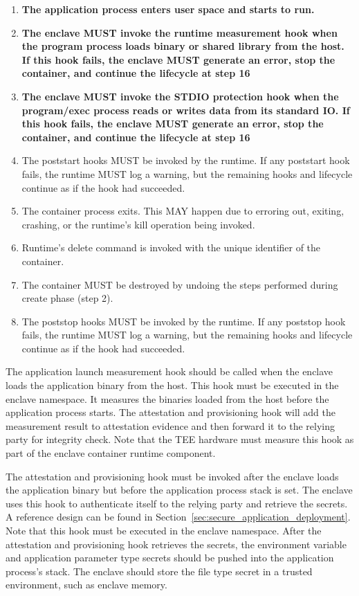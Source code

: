 \begin{enumerate}
    \item \textbf{The application process enters user space and starts to run.}
    \item \textbf{The enclave MUST invoke the runtime measurement hook when the program process loads binary or shared library from the host. If this hook fails, the enclave MUST generate an error, stop the container, and continue the lifecycle at step 16}
    \item \textbf{The enclave MUST invoke the STDIO protection hook when the program/exec process reads or writes data from its standard IO. If this hook fails, the enclave MUST generate an error, stop the container, and continue the lifecycle at step 16}
    \item The poststart hooks MUST be invoked by the runtime. If any poststart hook fails, the runtime MUST log a warning, but the remaining hooks and lifecycle continue as if the hook had succeeded.
    \item The container process exits. This MAY happen due to erroring out, exiting, crashing, or the runtime's kill operation being invoked.
    \item Runtime's delete command is invoked with the unique identifier of the container.
    \item The container MUST be destroyed by undoing the steps performed during create phase (step 2).
    \item The poststop hooks MUST be invoked by the runtime. If any poststop hook fails, the runtime MUST log a warning, but the remaining hooks and lifecycle continue as if the hook had succeeded.    
  \end{enumerate}

  

  The application launch measurement hook should be called when the enclave loads the application binary from the host. This hook must be executed in the enclave namespace. It measures the binaries loaded from the host before the application process starts. The attestation and provisioning hook will add the measurement result to attestation evidence and then 
  forward it to the relying party for integrity check. Note that the TEE hardware must measure this hook as part of the enclave container runtime component.
 
  The attestation and provisioning hook must be invoked after the enclave loads the application binary but before the application process stack is set. The enclave uses this hook to authenticate itself to the relying party and retrieve the secrets. A reference design can be found in Section~\ref{sec:secure_application_deployment}. Note that this hook must be 
  executed in the enclave namespace. After the attestation and provisioning hook retrieves the secrets, the environment variable and application parameter type secrets should be pushed into the application process's stack. The enclave should store the file type secret in a trusted environment, such as enclave memory. 
   

